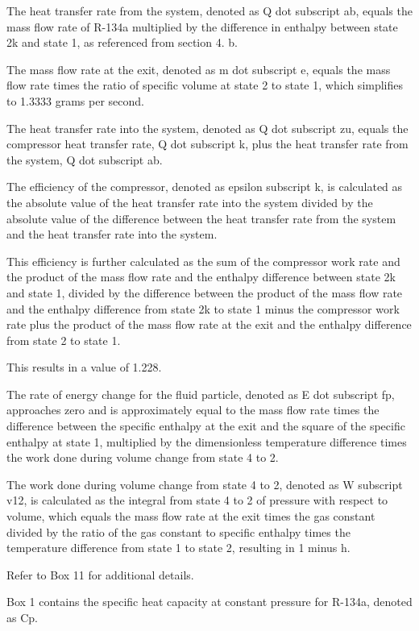 The heat transfer rate from the system, denoted as Q dot subscript ab, equals the mass flow rate of R-134a multiplied by the difference in enthalpy between state 2k and state 1, as referenced from section 4. b.

The mass flow rate at the exit, denoted as m dot subscript e, equals the mass flow rate times the ratio of specific volume at state 2 to state 1, which simplifies to 1.3333 grams per second.

The heat transfer rate into the system, denoted as Q dot subscript zu, equals the compressor heat transfer rate, Q dot subscript k, plus the heat transfer rate from the system, Q dot subscript ab.

The efficiency of the compressor, denoted as epsilon subscript k, is calculated as the absolute value of the heat transfer rate into the system divided by the absolute value of the difference between the heat transfer rate from the system and the heat transfer rate into the system.

This efficiency is further calculated as the sum of the compressor work rate and the product of the mass flow rate and the enthalpy difference between state 2k and state 1, divided by the difference between the product of the mass flow rate and the enthalpy difference from state 2k to state 1 minus the compressor work rate plus the product of the mass flow rate at the exit and the enthalpy difference from state 2 to state 1.

This results in a value of 1.228.

The rate of energy change for the fluid particle, denoted as E dot subscript fp, approaches zero and is approximately equal to the mass flow rate times the difference between the specific enthalpy at the exit and the square of the specific enthalpy at state 1, multiplied by the dimensionless temperature difference times the work done during volume change from state 4 to 2.

The work done during volume change from state 4 to 2, denoted as W subscript v12, is calculated as the integral from state 4 to 2 of pressure with respect to volume, which equals the mass flow rate at the exit times the gas constant divided by the ratio of the gas constant to specific enthalpy times the temperature difference from state 1 to state 2, resulting in 1 minus h.

Refer to Box 11 for additional details.

Box 1 contains the specific heat capacity at constant pressure for R-134a, denoted as Cp.